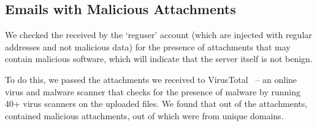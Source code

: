 \subsection{Emails with Malicious Attachments}
We checked the \emails received by the `reguser' account (which are injected with regular \email addresses and not malicious data) for the presence of attachments that may contain malicious software, which will indicate that the server itself is not benign. 

To do this, we passed the \totalattachmentcount attachments we received to VirusTotal~\cite{virustotal} -- an online virus and malware scanner that checks for the presence of malware by running 40+ virus scanners on the uploaded files. We found that out of the \totalattachmentcount attachments, \totalvirusemails \emails contained malicious attachments, out of which \totalvirusattachmentcount were from unique domains. 
